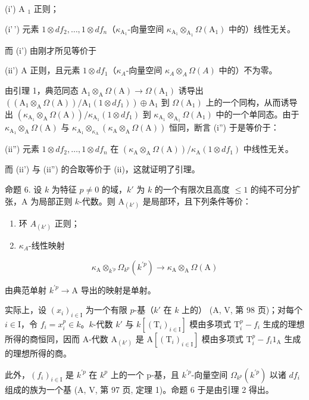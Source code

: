 (i') A \(_{1}\) 正则；

(i'\,') 元素 \(1 \otimes df_2, \ldots, 1 \otimes df_n\)（\(\kappa_{\mathrm{A}_1}\)-向量空间 \(\kappa_{\mathrm{A}_1} \otimes_{\mathrm{A}_1} \Omega(\mathrm{A}_1)\) 中的）线性无关。

而 (i') 由刚才所见等价于

(ii') A 正则，且元素 \(1 \otimes df_{1}\)（\(\kappa_{A}\)-向量空间 \(\kappa_{A} \otimes_{A} \Omega(A)\) 中的）不为零。

由引理 1，典范同态 \(\mathrm{A}_{1} \otimes_{\mathrm{A}} \Omega(\mathrm{A}) \to \Omega(\mathrm{A}_{1})\) 诱导出 \(((\mathrm{A}_{1} \otimes_{\mathrm{A}} \Omega(\mathrm{A})) / \mathrm{A}_{1}(1 \otimes df_{1})) \oplus \mathrm{A}_{1}\) 到 \(\Omega(\mathrm{A}_{1})\) 上的一个同构，从而诱导出 \((\kappa_{\mathrm{A}_{1}} \otimes_{\mathrm{A}} \Omega(\mathrm{A})) / \kappa_{\mathrm{A}_{1}}(1 \otimes df_{1})\) 到 \(\kappa_{\mathrm{A}_{1}} \otimes_{\mathrm{A}_{1}} \Omega(\mathrm{A}_{1})\) 中的一个单同态。由于 \(\kappa_{\mathrm{A}_{1}} \otimes_{\mathrm{A}} \Omega(\mathrm{A})\) 与 \(\kappa_{\mathrm{A}_{1}} \otimes_{\kappa_{\mathrm{A}}} (\kappa_{\mathrm{A}} \otimes_{\mathrm{A}} \Omega(\mathrm{A}))\) 恒同，断言 (i'') 于是等价于：

(ii'') 元素 \(1 \otimes df_2, \ldots, 1 \otimes df_n\) 在 \((\kappa_{\mathrm{A}} \otimes_{\mathrm{A}} \Omega(\mathrm{A})) / \kappa_{\mathrm{A}}(1 \otimes df_1)\) 中线性无关。

而 (ii') 与 (ii'') 的合取等价于 (ii)，这就证明了引理。

命题 6. 设 \(k\) 为特征 \(p \neq 0\) 的域，\(k'\) 为 \(k\) 的一个有限次且高度 \(\leqslant 1\) 的纯不可分扩张，A 为局部正则 \(k\)-代数。则 \(\mathrm{A}_{(k')}\) 是局部环，且下列条件等价：

\begin{enumerate}
\def\labelenumi{(\roman{enumi})}
\item
  环 \(A_{(k')}\) 正则；
\item
  \(\kappa_{A}\)-线性映射
\end{enumerate}

\[
\kappa_ {\mathrm{A}} \otimes_ {k ^ {\prime p}} \Omega_ {k ^ {p}} (k ^ {\prime p}) \longrightarrow \kappa_ {\mathrm{A}} \otimes_ {\mathrm{A}} \Omega (\mathrm{A})
\]

由典范单射 \(k^{\prime p}\to \mathrm{A}\) 导出的映射是单射。

实际上，设 \((x_{i})_{i\in \mathrm{I}}\) 为一个有限 \(p\)-基（\(k'\) 在 \(k\) 上的） (A, V, 第 98 页)；对每个 \(i\in \mathrm{I}\)，令 \(f_{i} = x_{i}^{p}\in k\)。\(k\)-代数 \(k'\) 与 \(k[(\mathrm{T}_i)_{i\in \mathrm{I}}]\) 模由多项式 \(\mathrm{T}_i^p - f_i\) 生成的理想所得的商恒同，因而 A-代数 \(\mathrm{A}_{(k')}\) 是 \(\mathrm{A}[(\mathrm{T}_i)_{i\in \mathrm{I}}]\) 模由多项式 \(\mathrm{T}_i^p - f_i1_{\mathrm{A}}\) 生成的理想所得的商。

此外，\((f_{i})_{i\in\mathrm{I}}\) 是 \(k^{\prime p}\) 在 \(k^{p}\) 上的一个 p-基，且 \(k^{\prime p}\)-向量空间 \(\Omega_{k^{p}}(k^{\prime p})\) 以诸 \(df_{i}\) 组成的族为一个基 (A, V, 第 97 页, 定理 1)。命题 6 于是由引理 2 得出。

